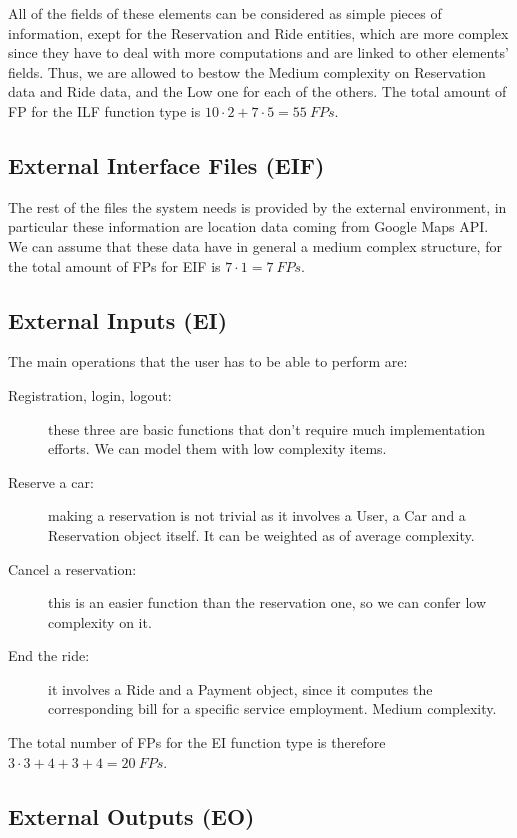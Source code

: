 All of the fields of these elements can be considered as simple pieces of information, exept for the Reservation and Ride entities, which are more complex since they have to deal with more computations and are linked to other elements' fields. Thus, we are allowed to bestow the Medium complexity on Reservation data and Ride data, and the Low one for each of the others. The total amount of FP for the ILF function type is \( 10 \cdot 2 + 7 \cdot 5 = 55 \> FPs \).

\subsection{External Interface Files (EIF)}

The rest of the files the system needs is provided by the external environment, in particular these information are location data coming from Google Maps API. We can assume that these data have in general a medium complex structure, for the total amount of FPs for EIF is \( 7 \cdot 1 = 7 \> FPs \).

\subsection{External Inputs (EI)}

The main operations that the user has to be able to perform are:

\begin{description}
\item[Registration, login, logout:] these three are basic functions that don't require much implementation efforts. We can model them with low complexity items.
\item[Reserve a car:] making a reservation is not trivial as it involves a User, a Car and a Reservation object itself. It can be weighted as of average complexity.
\item[Cancel a reservation:] this is an easier function than the reservation one, so we can confer low complexity on it.
\item[End the ride:] it involves a Ride and a Payment object, since it computes the corresponding bill for a specific service employment. Medium complexity.
\end{description}

The total number of FPs for the EI function type is therefore \( 3 \cdot 3 + 4 + 3 + 4 = 20 \> FPs \).

\subsection{External Outputs (EO)}

